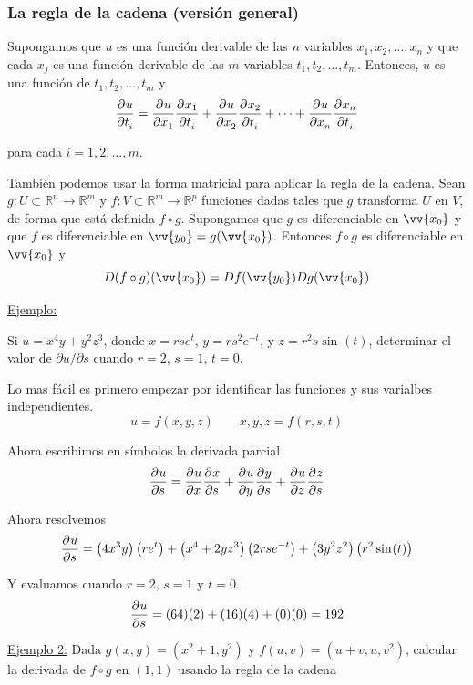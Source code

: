 \documentclass[12pt]{article}
\begin{document}
\subsubsection{La regla de la cadena (versión general)}
Supongamos que $ u $ es una función derivable de las $ n $ variables $ x_{1},x_{2},\dots ,x_{n} $ y que cada $ x_{j} $ es una función derivable de las $ m $ variables $ t_{1},t_{2},\dots ,t_{m} $. Entonces, $ u $ es una función de $ t_{1}, t_{2},\dots,t_{m} $ y
\[
\pdv[]{u}{t_{i}} = \pdv[]{u}{x_{1}}\pdv[]{x_{1}}{t_{i}} + \pdv[]{u}{x_{2}}\pdv[]{x_{2}}{t_{i}} + \dots  + \pdv[]{u}{x_{n}}\pdv[]{x_{n}}{t_{i}}
\]

para cada $ i=1,2,\dots ,m $.

También podemos usar la forma matricial para aplicar la regla de la cadena. Sean $ g:U  \subset \mathbb{R}^{n} \to \mathbb{R}^{m} $ y $ f:V \subset \mathbb{R}^{m} \to \mathbb{R}^{p} $ funciones dadas tales que $ g $ transforma $ U $ en $ V $, de forma que está definida $ f \circ g $. Supongamos que $ g $ es diferenciable en $ \vv{x_{0}} $ y que $ f $ es diferenciable en $ \vv{y_{0}}=g(\vv{x_{0}}) $. Entonces $ f\circ g $ es diferenciable en $ \vv{x_{0}} $ y 
\[
  D(f\circ g)(\vv{x_{0}})=Df(\vv{y_{0}})Dg(\vv{x_{0}})
\]

\underline{Ejemplo:}

Si $ u=x^4y+y^2z^3 $, donde $ x=rse^t $, $ y=rs^2e^{-t} $, y $ z=r^2s\sin^{}(t) $, determinar el valor de $ \partial u/\partial s $ cuando $ r=2 $, $ s=1 $, $ t=0 $.

Lo mas fácil es primero empezar por identificar las funciones y sus varialbes independientes.
\[
	u = f(x,y,z) \qquad x,y,z = f(r,s,t)
\]

Ahora escribimos en símbolos la derivada parcial
\[
\pdv[]{u}{s} = \pdv[]{u}{x}\pdv[]{x}{s} + \pdv[]{u}{y}\pdv[]{y}{s} + \pdv[]{u}{z}\pdv[]{z}{s}
\]

Ahora resolvemos
\[
\pdv[]{u}{s} = \left(4x^3y\right)\left(re^t\right) + \left(x^4+2yz^3\right)\left(2rse^{-t}\right) + \left(3y^2z^2\right)\left(r^2\sin^{}(t)\right)
\]

Y evaluamos cuando $ r=2 $, $ s=1 $ y $ t=0 $.
\[
\pdv[]{u}{s} = (64)(2) + (16)(4) + (0)(0) = 192
\]

\underline{Ejemplo 2:} Dada $ g(x,y)=(x^2+1,y^2) $ y $ f(u,v)=(u+v,u,v^2) $, calcular la derivada de $ f\circ g $ en $ (1,1) $ usando la regla de la cadena
\end{document}
